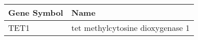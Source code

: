\begin{tabular}{ll}
\toprule
Gene Symbol &                             Name \\
\midrule
       TET1 & tet methylcytosine dioxygenase 1 \\
\bottomrule
\end{tabular}
